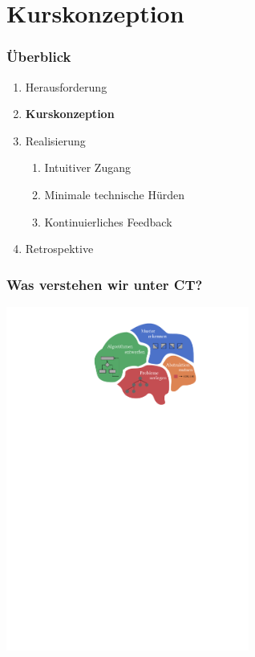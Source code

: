 \documentclass[german,aspectratio=169]{beamer}
\begin{document}
\section{Kurskonzeption}

\begin{frame}
	\frametitle{Überblick}
		\begin{enumerate}[label = \arabic*.]
			\item Herausforderung
			\item \textbf{Kurskonzeption}
			\item Realisierung
			\begin{enumerate}[label = 3.\arabic*]
				\item Intuitiver Zugang
				\item Minimale technische Hürden
				\item Kontinuierliches Feedback
			\end{enumerate}
			\item Retrospektive
		\end{enumerate}
\end{frame}

\begin{frame}
	\frametitle{Was verstehen wir unter CT?}
	\begin{center}
		\includegraphics[width=0.6\textwidth]{./figs/ct-logo}
	\end{center}
\end{frame}

\end{document}

